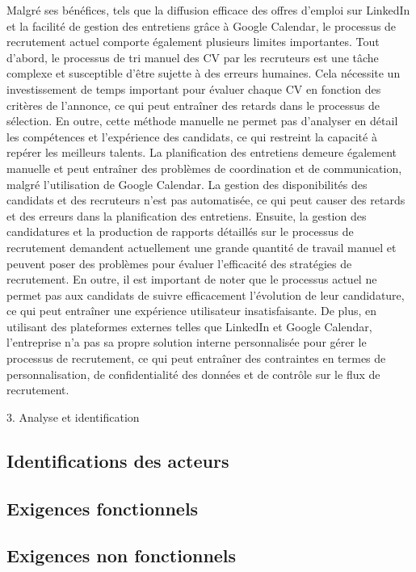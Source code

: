 Malgré ses bénéfices, tels que la diffusion efficace des offres d'emploi sur LinkedIn et la facilité de gestion des entretiens grâce à Google Calendar, le processus de recrutement actuel comporte également plusieurs limites importantes. Tout d'abord, le processus de tri manuel des CV par les recruteurs est une tâche complexe et susceptible d'être sujette à des erreurs humaines. Cela nécessite un investissement de temps important pour évaluer chaque CV en fonction des critères de l'annonce, ce qui peut entraîner des retards dans le processus de sélection. En outre, cette méthode manuelle ne permet pas d'analyser en détail les compétences et l'expérience des candidats, ce qui restreint la capacité à repérer les meilleurs talents. La planification des entretiens demeure également manuelle et peut entraîner des problèmes de coordination et de communication, malgré l'utilisation de Google Calendar. La gestion des disponibilités des candidats et des recruteurs n'est pas automatisée, ce qui peut causer des retards et des erreurs dans la planification des entretiens. Ensuite, la gestion des candidatures et la production de rapports détaillés sur le processus de recrutement demandent actuellement une grande quantité de travail manuel et peuvent poser des problèmes pour évaluer l'efficacité des stratégies de recrutement. En outre, il est important de noter que le processus actuel ne permet pas aux candidats de suivre efficacement l'évolution de leur candidature, ce qui peut entraîner une expérience utilisateur insatisfaisante. De plus, en utilisant des plateformes externes telles que LinkedIn et Google Calendar, l'entreprise n'a pas sa propre solution interne personnalisée pour gérer le processus de recrutement, ce qui peut entraîner des contraintes en termes de personnalisation, de confidentialité des données et de contrôle sur le flux de recrutement.

3. Analyse et identification

\subsection{Identifications des acteurs }

\subsection{Exigences fonctionnels}

\subsection{Exigences non fonctionnels}

